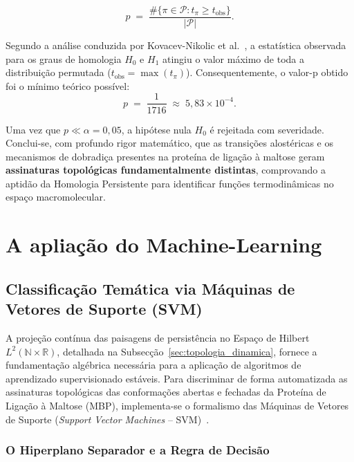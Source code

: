 \documentclass[12pt, a4paper]{article}
\begin{document}
\begin{equation*} \label{eq:valor_p}
  p \;=\; \frac{\#\bigl\{\pi \in \mathcal{P} : t_{\pi} \ge t_{\text{obs}}\bigr\}} {|\mathcal{P}|}.
\end{equation*}
 
Segundo a análise conduzida por Kovacev-Nikolic et al.~\cite{kovacev2016}, a estatística observada para os graus de homologia $H_0$ e $H_1$ atingiu o valor máximo de toda a distribuição permutada ($t_{\text{obs}} = \max(t_\pi)$). Consequentemente, o valor-p obtido foi o mínimo teórico possível:
\begin{equation*}
  p \;=\; \frac{1}{1716} \;\approx\; 5{,}83 \times 10^{-4}.
\end{equation*}

Uma vez que $p \ll \alpha = 0{,}05$, a hipótese nula $H_0$ é rejeitada com severidade. Conclui-se, com profundo rigor matemático, que as transições alostéricas e os mecanismos de dobradiça presentes na proteína de ligação à maltose geram \textbf{assinaturas topológicas fundamentalmente distintas}, comprovando a aptidão da Homologia Persistente para identificar funções termodinâmicas no espaço macromolecular.

\section{A apliação do Machine-Learning}

\subsection{Classificação Temática via Máquinas de Vetores de Suporte (SVM)}
\label{sec:svm}

A projeção contínua das paisagens de persistência no Espaço de Hilbert $L^2(\mathbb{N} \times \mathbb{R})$, detalhada na Subsecção~\ref{sec:topologia_dinamica}, fornece a fundamentação algébrica necessária para a aplicação de algoritmos de aprendizado supervisionado estáveis. Para discriminar de forma automatizada as assinaturas topológicas das conformações abertas e fechadas da Proteína de Ligação à Maltose (MBP), implementa-se o formalismo das Máquinas de Vetores de Suporte (\textit{Support Vector Machines} -- SVM)~\cite{Cortes1995}.

\subsubsection{O Hiperplano Separador e a Regra de Decisão}
\end{document}
